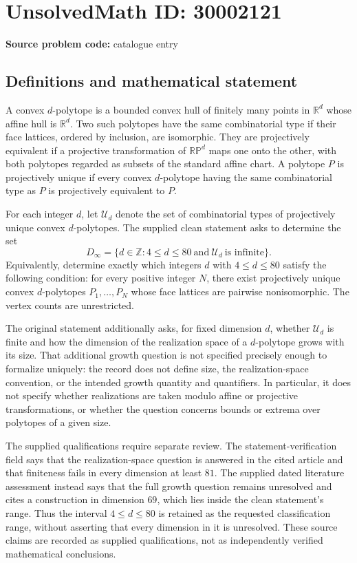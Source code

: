 \documentclass[11pt]{article}
\newcommand{\Z}{\mathbb{Z}}
\newcommand{\R}{\mathbb{R}}
\begin{document}
\section*{UnsolvedMath ID: 30002121}
\textbf{Source problem code:} catalogue entry
\subsection{Definitions and mathematical statement}
A convex \(d\)-polytope is a bounded convex hull of finitely many points in \(\R^d\) whose affine hull is \(\R^d\). Two such polytopes have the same combinatorial type if their face lattices, ordered by inclusion, are isomorphic. They are projectively equivalent if a projective transformation of \(\mathbb{RP}^d\) maps one onto the other, with both polytopes regarded as subsets of the standard affine chart. A polytope \(P\) is projectively unique if every convex \(d\)-polytope having the same combinatorial type as \(P\) is projectively equivalent to \(P\).

For each integer \(d\), let \(\mathcal U_d\) denote the set of combinatorial types of projectively unique convex \(d\)-polytopes. The supplied clean statement asks to determine the set
\[
D_{\infty}=\bigl\{d\in\Z:4\le d\le80\ \text{and}\ \mathcal U_d\ \text{is infinite}\bigr\}.
\]
Equivalently, determine exactly which integers \(d\) with \(4\le d\le80\) satisfy the following condition: for every positive integer \(N\), there exist projectively unique convex \(d\)-polytopes \(P_1,\ldots,P_N\) whose face lattices are pairwise nonisomorphic. The vertex counts are unrestricted.

The original statement additionally asks, for fixed dimension \(d\), whether \(\mathcal U_d\) is finite and how the dimension of the realization space of a \(d\)-polytope grows with its size. That additional growth question is not specified precisely enough to formalize uniquely: the record does not define size, the realization-space convention, or the intended growth quantity and quantifiers. In particular, it does not specify whether realizations are taken modulo affine or projective transformations, or whether the question concerns bounds or extrema over polytopes of a given size.

The supplied qualifications require separate review. The statement-verification field says that the realization-space question is answered in the cited article and that finiteness fails in every dimension at least \(81\). The supplied dated literature assessment instead says that the full growth question remains unresolved and cites a construction in dimension \(69\), which lies inside the clean statement's range. Thus the interval \(4\le d\le80\) is retained as the requested classification range, without asserting that every dimension in it is unresolved. These source claims are recorded as supplied qualifications, not as independently verified mathematical conclusions.
\end{document}
